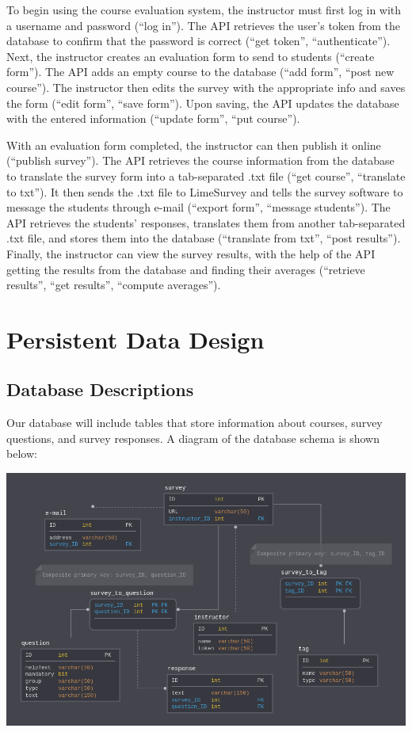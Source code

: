 \documentclass{article}
\begin{document}
\newpage

To begin using the course evaluation system, the instructor must first log in with a username and password (``log in''). The API retrieves the user's token from the database to confirm that the password is correct (``get token'', ``authenticate''). Next, the instructor creates an evaluation form to send to students (``create form''). The API adds an empty course to the database (``add form'', ``post new course''). The instructor then edits the survey with the appropriate info and saves the form (``edit form'', ``save form''). Upon saving, the API updates the database with the entered information (``update form'', ``put course'').

With an evaluation form completed, the instructor can then publish it online (``publish survey''). The API retrieves the course information from the database to translate the survey form into a tab-separated .txt file (``get course'', ``translate to txt''). It then sends the .txt file to LimeSurvey and tells the survey software to message the students through e-mail (``export form'', ``message students''). The API retrieves the students' responses, translates them from another tab-separated .txt file, and stores them into the database (``translate from txt'', ``post results''). Finally, the instructor can view the survey results, with the help of the API getting the results from the database and finding their averages (``retrieve results'', ``get results'', ``compute averages'').

\section{Persistent Data Design}
\subsection{Database Descriptions}

Our database will include tables that store information about courses, survey questions, and survey responses. A diagram of the database schema is shown below:

\begin{center}
\label{fig:schemadiagram}
{\includegraphics[scale=.6]{images/schema_diagram.png}} 
\end{center}
\end{document}
